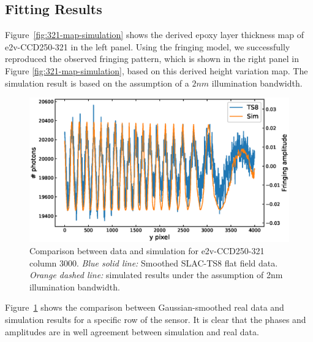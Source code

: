 \documentclass[twocolumn]{aastex63} %
\begin{document}
\begin{CJK*}{UTF8}{gbsn}
\subsection{Fitting Results} \label{sec:Fitting Results}
Figure~\ref{fig:321-map-simulation} shows the derived epoxy layer thickness map of e2v-CCD250-321 in the left panel. Using the fringing model, we successfully reproduced the observed fringing pattern, which is shown in the right panel in Figure \ref{fig:321-map-simulation}, based on this derived height variation map. The simulation result is based on the assumption of a $2nm$ illumination bandwidth.
\begin{figure}[hbt]
\centering
\includegraphics[scale = 0.4]{E2V-321-detail-compare.eps}
\caption{Comparison between data and simulation for e2v-CCD250-321 column 3000. {\it Blue solid line:} Smoothed SLAC-TS8 flat field data. {\it Orange dashed line:} simulated results under the assumption of 2nm illumination bandwidth.}
\label{fig:321-detail-compare}
\end{figure}
Figure~\ref{fig:321-detail-compare} shows the comparison between Gaussian-smoothed real data and simulation results for a specific row of the sensor. It is clear that the phases and amplitudes are in well agreement between simulation and real data.



\end{CJK*}
\end{document}
